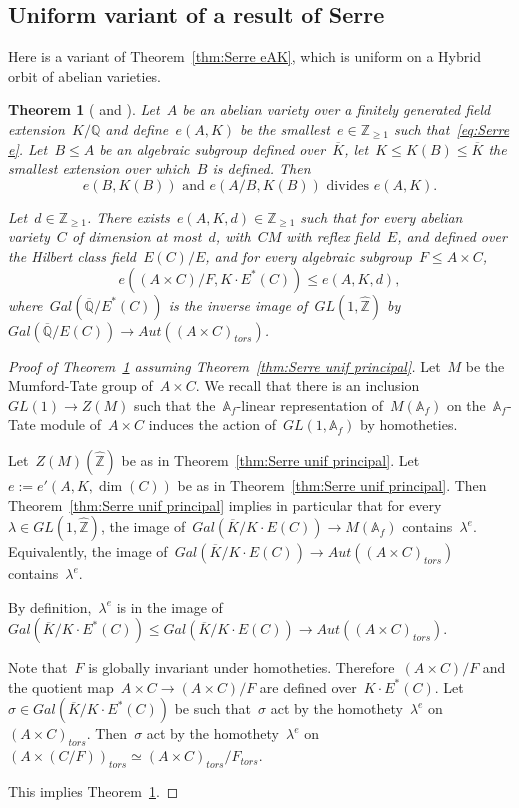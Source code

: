 \documentclass[12pt]{amsart}
\newtheorem{theorem}{Theorem}[section]
\newcommand{\Z}{{\mathbb Z}}
\newcommand{\Q}{{\mathbb Q}}
\newcommand{\A}{{\mathbb A}}
\newcommand{\ol}{\overline}
\newcommand{\wh}{\widehat}
\begin{document}
\subsection{Uniform variant of a result of Serre}
Here is a variant of Theorem~\ref{thm:Serre eAK}, which is uniform on a Hybrid orbit of abelian varieties.
\begin{theorem}[{\cite[loc. cit.]{Serre:O4}} and {\cite[App.~B]{RY:IHES}}]\label{thm:Serre hybrid}
Let~$A$ be an abelian variety over a finitely generated field extension~$K/\Q$ and define~$e(A,K)$ be the smallest~$e\in\Z_{\geq1}$ such that~\eqref{eq:Serre e}.
 Let~$B\leq A$ be an algebraic subgroup defined over~$\ol{K}$,  let~$K\leq K(B)\leq \ol{K}$ the smallest extension over which~$B$ is defined.
Then
\[\label{eq:isog unif}
e(B,K(B))\text{ and }e(A/B,K(B))\text{ divides }e(A,K).
\]

Let~$d\in\Z_{\geq1}$. There exists~$e(A,K,d)\in\Z_{\geq1}$ such that for every abelian variety~$C$ of dimension at most~$d$, with~$CM$ with reflex field~$E$, and defined over the Hilbert class field~$E(C)/E$, and for every algebraic subgroup~$F\leq A\times C$, 
\[
e((A\times C)/F,K\cdot E^\ast(C))\leq e(A,K,d),
\]
where~$Gal(\ol{\Q}/ E^\ast(C))$ is the inverse image of~$GL(1,\wh{\Z})$ by~$Gal(\ol{\Q}/ E(C))\to Aut((A\times C)_{tors})$.
\end{theorem}
\begin{proof}[Proof of Theorem~\ref{thm:Serre hybrid} assuming Theorem~\ref{thm:Serre unif principal}]
Let~$M$ be the Mumford-Tate group of~$A\times C$. We recall that there is an inclusion~$GL(1)\to Z(M)$ such that the~$\A_f$-linear representation of~$M(\A_f)$ on the~$\A_f$-Tate module of~$A\times C$ induces the action of~$GL(1,\A_f)$ by homotheties.

Let~$Z(M)(\wh{\Z})$ be as in Theorem~\ref{thm:Serre unif principal}. Let~$e:=e'(A,K,\dim(C))$ be as in Theorem~\ref{thm:Serre unif principal}. Then Theorem~\ref{thm:Serre unif principal} implies in particular that for every~$\lambda \in GL(1,\wh{\Z})$, the image of~$Gal(\ol{K}/K\cdot E(C))\to M(\A_f)$ contains~$\lambda^e$. Equivalently, the image of~$Gal(\ol{K}/K\cdot E(C))\to Aut((A\times C)_{tors})$ contains~$\lambda^e$.

By definition,~$\lambda^e$ is in the image of~$Gal(\ol{K}/K\cdot E^\ast(C))\leq Gal(\ol{K}/K\cdot E(C))\to Aut((A\times C)_{tors})$. 

Note that~$F$ is globally invariant under homotheties. Therefore~$(A\times C)/F$ and the quotient map~$A\times C\to (A\times C)/F$ are defined over~$K\cdot E^\ast(C)$. Let~$\sigma\in Gal(\ol{K}/K\cdot E^{\ast}(C))$ be such that~$\sigma$ act by the homothety~$\lambda^e$ on~$(A\times C)_{tors}$. Then~$\sigma$ act by the homothety~$\lambda^e$ on~$(A\times (C/F))_{tors}\simeq (A\times C)_{tors}/F_{tors}$.

This implies Theorem~\ref{thm:Serre hybrid}.
\end{proof}
\end{document}
